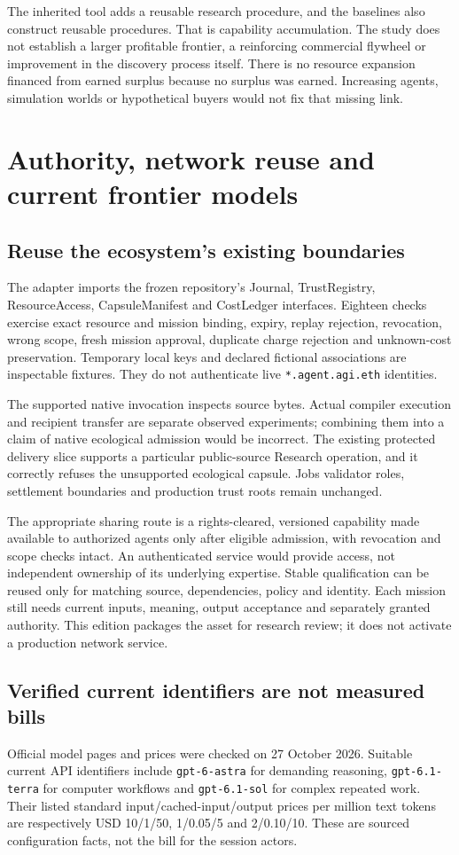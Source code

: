 \documentclass[11pt]{article}
\begin{document}
The inherited tool adds a reusable research procedure, and the baselines also construct reusable procedures. That is capability accumulation. The study does not establish a larger profitable frontier, a reinforcing commercial flywheel or improvement in the discovery process itself. There is no resource expansion financed from earned surplus because no surplus was earned. Increasing agents, simulation worlds or hypothetical buyers would not fix that missing link.

\section{Authority, network reuse and current frontier models}
\subsection{Reuse the ecosystem's existing boundaries}
The adapter imports the frozen repository's Journal, TrustRegistry, ResourceAccess, CapsuleManifest and CostLedger interfaces. Eighteen checks exercise exact resource and mission binding, expiry, replay rejection, revocation, wrong scope, fresh mission approval, duplicate charge rejection and unknown-cost preservation. Temporary local keys and declared fictional associations are inspectable fixtures. They do not authenticate live \texttt{*.agent.agi.eth} identities.

The supported native invocation inspects source bytes. Actual compiler execution and recipient transfer are separate observed experiments; combining them into a claim of native ecological admission would be incorrect. The existing protected delivery slice supports a particular public-source Research operation, and it correctly refuses the unsupported ecological capsule. Jobs validator roles, settlement boundaries and production trust roots remain unchanged.

The appropriate sharing route is a rights-cleared, versioned capability made available to authorized agents only after eligible admission, with revocation and scope checks intact. An authenticated service would provide access, not independent ownership of its underlying expertise. Stable qualification can be reused only for matching source, dependencies, policy and identity. Each mission still needs current inputs, meaning, output acceptance and separately granted authority. This edition packages the asset for research review; it does not activate a production network service.

\subsection{Verified current identifiers are not measured bills}
Official model pages and prices were checked on 27 October 2026. Suitable current API identifiers include \texttt{gpt-6-astra} for demanding reasoning, \texttt{gpt-6.1-terra} for computer workflows and \texttt{gpt-6.1-sol} for complex repeated work. Their listed standard input/cached-input/output prices per million text tokens are respectively USD 10/1/50, 1/0.05/5 and 2/0.10/10. These are sourced configuration facts, not the bill for the session actors.\cite{astra,terra,prices}
\end{document}
